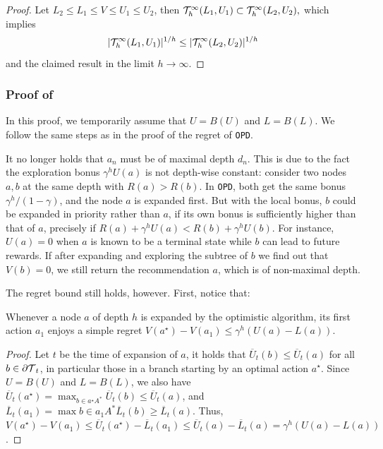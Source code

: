 \begin{subappendices}
\begin{proof}
Let $L_2\leq L_1\leq V\leq U_1\leq U_2$, then $\mathcal{T}_h^\infty(L_1,U_1) \subset \mathcal{T}_h^\infty(L_2,U_2),$ which implies $$|\mathcal{T}_h^\infty(L_1,U_1)|^{1/h} \leq |\mathcal{T}_h^\infty(L_2,U_2)|^{1/h}$$ and the claimed result in the limit $h\rightarrow\infty$.
\end{proof}

\subsubsection{Proof of }
In this proof, we temporarily assume that $U=B(U)$ and $L=B(L)$. We follow the same steps as in the proof of the regret of \texttt{OPD}.

\begin{remark}
\begin{leftbar}[remarkbar]
It no longer holds that $a_n$ must be of maximal depth $d_n$.  This is due to the fact the exploration bonus $\gamma^h U(a)$ is not depth-wise constant: consider two nodes $a,b$ at the same depth with $R(a) > R(b)$. In \texttt{OPD}, both get the same bonus $\gamma^h/(1-\gamma)$, and the node $a$ is expanded first. But with the local bonus, $b$ could be expanded in priority rather than $a$, if its own bonus is sufficiently higher than that of $a$, precisely if $R(a)+\gamma^h U(a) < R(b)+\gamma^h U(b)$. For instance, $U(a)=0$ when $a$ is known to be a terminal state while $b$ can lead to future rewards. If after expanding and exploring the subtree of $b$ we find out that $V(b) = 0$, we still return the recommendation $a$, which is of non-maximal depth.
\end{leftbar}
\end{remark}

The regret bound still holds, however. First, notice that:
\begin{lemma}[Expansion]
\begin{leftbar}[lemmabar]
\label{lem:expansion-bound-U}
Whenever a node $a$ of depth $h$ is expanded by the optimistic algorithm, its first action $a_1$ enjoys a simple regret $V(a^\star)-V(a_1) \leq \gamma^h(U(a)-L(a))$. 
\end{leftbar}
\end{lemma}
\begin{proof}
Let $t$ be the time of expansion of $a$, it holds that $\overline{U}_t(b) \leq \overline{U}_t(a)$ for all $b\in {\partial \mathcal{T}}_t$, in particular those in a branch starting by an optimal action $a^\star$. Since $U=B(U)$ and $L=B(L)$, we also have $\overline{U}_t(a^\star) = \max_{b\in a^\star A^*} \overline{U}_t(b) \leq \overline{U}_t(a)$, and $\overline{L}_t(a_1) = \max{b\in a_1 A^*} \overline{L}_t(b) \geq  \overline{L}_t(a)$. Thus, $V(a^\star)-V(a_1) \leq \overline{U}_t(a^\star) - \overline{L}_t(a_1) \leq \overline{U}_t(a) - \overline{L}_t(a) = \gamma^h(U(a)-L(a))$.
\end{proof}
 

\end{subappendices}

